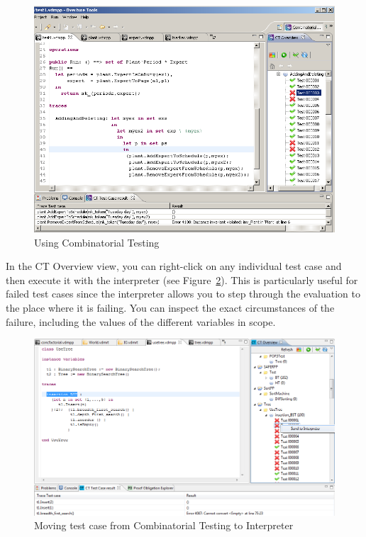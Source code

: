 \documentclass{overturerepchap}
\begin{document}
\begin{figure}[htbp]
\begin{center}
\includegraphics[width=4.5in]{screenDumps/tracesalarm}
\caption{Using Combinatorial Testing\label{fig:tracesalarm}}
\end{center}
\end{figure}

In the CT Overview view, you can right-click on any individual
test case and then execute it with the interpreter (see
Figure~\ref{fig:SendToInterpreter}). This is particularly useful for
failed test cases since the interpreter allows you to step through the
evaluation to the place where it is failing. You can inspect the exact
circumstances of the failure, including the values of the different
variables in scope. 

\begin{figure}[htbp]
\begin{center}
\includegraphics[width=4.5in]{screenDumps/SendToInterpreter}
\caption{Moving test case from Combinatorial Testing to Interpreter\label{fig:SendToInterpreter}}
\end{center}
\end{figure}
\end{document}

